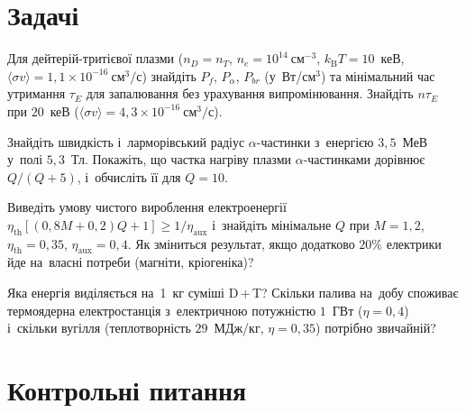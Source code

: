 \section*{Задачі}

\begin{problem}\label{prb:PlasmaFusion}
	Для дейтерій-тритієвої плазми ($n_D=n_T$, $n_e=10^{14}~\mathrm{см}^{-3}$, $k_{\mathrm
	B}T=10$~кеВ, $\langle\sigma v\rangle=1{,}1\times10^{-16}~\mathrm{см}^3/\mathrm{с}$)
	знайдіть $P_f$, $P_\alpha$, $P_{br}$ (у~Вт/$\mathrm{см}^3$) та мінімальний час
	утримання $\tau_E$ для запалювання без урахування випромінювання. Знайдіть $n\tau_E$
	при $20$~кеВ ($\langle\sigma v\rangle=4{,}3\times10^{-16}~\mathrm{см}^3/\mathrm{с}$).
\end{problem}

\begin{problem}\label{prb:new-alpha}
	Знайдіть швидкість і~ларморівський радіус $\alpha$-частинки з~енергією $3{,}5$~МеВ
	у~полі $5{,}3$~Тл. Покажіть, що частка нагріву плазми $\alpha$-частинками дорівнює
	$Q/(Q+5)$, і~обчисліть її для $Q=10$.
\end{problem}

\begin{problem}\label{prb:new-qeng}
	Виведіть умову чистого вироблення електроенергії
	$\eta_{\mathrm{th}}[(0{,}8M+0{,}2)Q+1]\geq1/\eta_{\mathrm{aux}}$ і~знайдіть мінімальне
	$Q$ при $M=1{,}2$, $\eta_{\mathrm{th}}=0{,}35$, $\eta_{\mathrm{aux}}=0{,}4$. Як
	зміниться результат, якщо додатково $20\%$ електрики йде на~власні потреби (магніти,
	кріогеніка)?
\end{problem}

\begin{problem}\label{prb:new-fuel}
	Яка енергія виділяється на~1~кг суміші D\,+\,T? Скільки палива на~добу споживає
	термоядерна електростанція з~електричною потужністю $1$~ГВт ($\eta=0{,}4$) і~скільки
	вугілля (теплотворність $29$~МДж/кг, $\eta=0{,}35$) потрібно звичайній?
\end{problem}

\section*{Контрольні питання}

